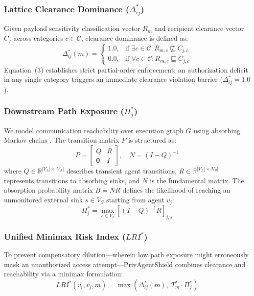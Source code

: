\documentclass[conference]{IEEEtran}
\begin{document}
\subsubsection{Lattice Clearance Dominance ($\Delta^*_{ij}$)}
Given payload sensitivity classification vector $R_m$ and recipient clearance vector $C_j$ across categories $c \in \mathcal{C}$, clearance dominance is defined as:
\begin{equation}
\Delta^*_{ij}(m) = \begin{cases} 
1.0, & \text{if } \exists c \in \mathcal{C} : R_{m,c} \not\sqsubseteq C_{j,c} \\ 
0.0, & \text{if } \forall c \in \mathcal{C} : R_{m,c} \sqsubseteq C_{j,c} 
\end{cases}
\end{equation}
Equation~(3) establishes strict partial-order enforcement: an authorization deficit in any single category triggers an immediate clearance violation barrier ($\Delta^*_{ij} = 1.0$).

\subsubsection{Downstream Path Exposure ($\Pi^*_j$)}
We model communication reachability over execution graph $G$ using absorbing Markov chains \cite{14}. The transition matrix $P$ is structured as:
\begin{equation}
P = \begin{bmatrix} Q & R \\ \mathbf{0} & I \end{bmatrix}, \quad N = (I - Q)^{-1}
\end{equation}
where $Q \in \mathbb{R}^{|V_A| \times |V_A|}$ describes transient agent transitions, $R \in \mathbb{R}^{|V_A| \times |V_S|}$ represents transitions to absorbing sinks, and $N$ is the fundamental matrix. The absorption probability matrix $B = NR$ defines the likelihood of reaching an unmonitored external sink $s \in V_S$ starting from agent $v_j$:
\begin{equation}
\Pi^*_j = \max_{s \in V_S} \left[ (I - Q)^{-1} R \right]_{j,s}
\end{equation}

\subsubsection{Unified Minimax Risk Index ($LRI^*$)}
To prevent compensatory dilution---wherein low path exposure might erroneously mask an unauthorized access attempt---PrivAgentShield combines clearance and reachability via a minimax formulation:
\begin{equation}
LRI^*(v_i, v_j, m) = \max \left( \Delta^*_{ij}(m), \; T^*_m \cdot \Pi^*_j \right)
\end{equation}
\end{document}
